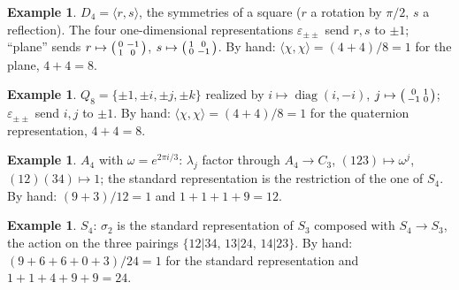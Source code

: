 \documentclass[11pt]{article}
\theoremstyle{definition}
\newtheorem{example}[theorem]{Example}
\theoremstyle{remark}
\newcommand{\claim}[1]{\leavevmode\marginpar{\raggedright\scriptsize\texttt{#1}}}
\newcommand{\ip}[2]{\langle #1, #2\rangle}
\begin{document}
\begin{example}\label{ex:d4}\claim{E-D4}
$D_4=\langle r,s\rangle$, the symmetries of a square ($r$ a rotation by $\pi/2$, $s$ a reflection). The four one-dimensional
representations $\varepsilon_{\pm\pm}$ send $r,s$ to $\pm1$; ``plane'' sends $r\mapsto\begin{psmallmatrix}0&-1\\1&0\end{psmallmatrix}$,
$s\mapsto\begin{psmallmatrix}1&0\\0&-1\end{psmallmatrix}$. By hand: $\ip{\chi}{\chi}=(4+4)/8=1$ for the plane, $4+4=8$.
\begin{center}\end{center}
\end{example}

\begin{example}\label{ex:q8}\claim{E-Q8}
$Q_8=\{\pm1,\pm i,\pm j,\pm k\}$ realized by $i\mapsto\operatorname{diag}(i,-i)$, $j\mapsto\begin{psmallmatrix}0&1\\-1&0\end{psmallmatrix}$;
$\varepsilon_{\pm\pm}$ send $i,j$ to $\pm1$. By hand: $\ip{\chi}{\chi}=(4+4)/8=1$ for the quaternion representation, $4+4=8$.
\begin{center}\end{center}
\end{example}

\begin{example}\label{ex:a4}\claim{E-A4}
$A_4$ with $\omega=e^{2\pi i/3}$: $\lambda_j$ factor through $A_4\to C_3$, $(123)\mapsto\omega^j$, $(12)(34)\mapsto1$; the
standard representation is the restriction of the one of $S_4$. By hand: $(9+3)/12=1$ and $1+1+1+9=12$.
\begin{center}\end{center}
\end{example}

\begin{example}\label{ex:s4}\claim{E-S4}
$S_4$: $\sigma_2$ is the standard representation of $S_3$ composed with $S_4\to S_3$, the action on the three pairings
$\{12|34,\,13|24,\,14|23\}$. By hand: $(9+6+6+0+3)/24=1$ for the standard representation and $1+1+4+9+9=24$.
\begin{center}\end{center}
\end{example}
\end{document}
